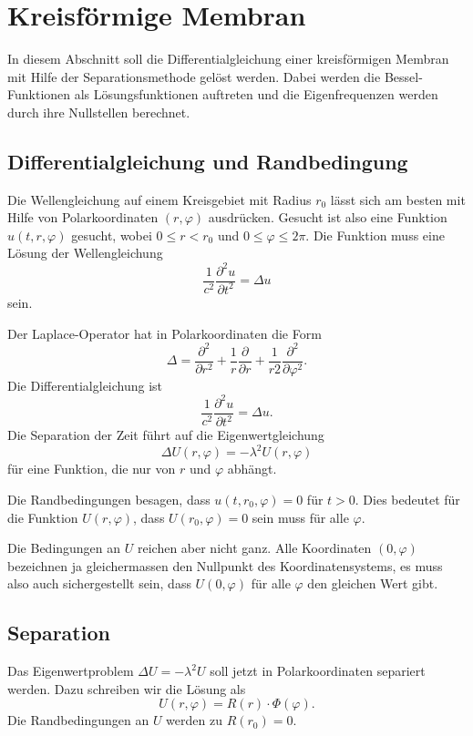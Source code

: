 %
%
%
\section{Kreisförmige Membran
\label{buch:pde:section:kreis}}
In diesem Abschnitt soll die Differentialgleichung einer kreisförmigen
Membran mit Hilfe der Separationsmethode gelöst werden.
Dabei werden die Bessel-Funktionen als Lösungsfunktionen 
auftreten und die Eigenfrequenzen werden durch ihre Nullstellen
berechnet.

\subsection{Differentialgleichung und Randbedingung}
Die Wellengleichung auf einem Kreisgebiet mit Radius $r_0$ 
lässt sich am besten mit Hilfe von Polarkoordinaten $(r,\varphi)$
ausdrücken.
Gesucht ist also eine Funktion $u(t,r,\varphi)$ gesucht, wobei
$0\le r<r_0$ und $0\le \varphi\le 2\pi$.
Die Funktion muss eine Lösung der Wellengleichung
\[
\frac{1}{c^2}\frac{\partial^2u}{\partial t^2} = \Delta u
\]
sein.

Der Laplace-Operator hat in Polarkoordinaten die Form
\begin{equation}
\Delta
=
\frac{\partial^2}{\partial r^2}
+
\frac1r
\frac{\partial}{\partial r}
+
\frac{1}{r 2}
\frac{\partial^2}{\partial\varphi^2}.
\label{buch:pde:kreis:laplace}
\end{equation}
Die Differentialgleichung ist 
\[
\frac{1}{c^2} \frac{\partial^2 u}{\partial t^2}
=
\Delta u.
\]
Die Separation der Zeit führt auf die Eigenwertgleichung
\[
\Delta U(r,\varphi) = -\lambda^2 U(r,\varphi)
\]
für eine Funktion, die nur von $r$ und $\varphi$ abhängt.

Die Randbedingungen besagen, dass $u(t,r_0,\varphi)=0$ für $t>0$.
Dies bedeutet für die Funktion $U(r,\varphi)$, dass
$U(r_0,\varphi)=0$ sein muss für alle $\varphi$.

Die Bedingungen an $U$ reichen aber nicht ganz.
Alle Koordinaten $(0,\varphi)$ bezeichnen ja gleichermassen
den Nullpunkt des Koordinatensystems, es muss also auch sichergestellt
sein, dass $U(0,\varphi)$ für alle $\varphi$ den gleichen Wert gibt.

\subsection{Separation}
Das Eigenwertproblem $\Delta U=-\lambda^2 U$ soll jetzt in Polarkoordinaten
separiert werden.
Dazu schreiben wir die Lösung als
\[
U(r,\varphi)
=
R(r)\cdot \Phi(\varphi).
\]
Die Randbedingungen an $U$ werden zu $R(r_0)=0$.

